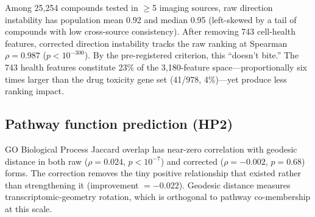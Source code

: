 \documentclass{article}
\begin{document}
Among 25{,}254 compounds tested in $\geq$5 imaging sources, raw direction
instability has population mean 0.92 and median 0.95 (left-skewed by a
tail of compounds with low cross-source consistency). After removing 743
cell-health features, corrected direction instability tracks the raw ranking
at Spearman $\rho = 0.987$ ($p < 10^{-300}$). By the pre-registered
criterion, this ``doesn't bite.'' The 743 health features constitute
23\% of the 3{,}180-feature space---proportionally six times larger than
the drug toxicity gene set (41/978, 4\%)---yet produce less ranking
impact.

\subsection{Pathway function prediction (HP2)}

GO Biological Process Jaccard overlap has near-zero correlation with geodesic
distance in both raw ($\rho = 0.024$, $p < 10^{-7}$) and corrected ($\rho =
-0.002$, $p = 0.68$) forms. The correction removes the tiny positive
relationship that existed rather than strengthening it (improvement $=
-0.022$). Geodesic distance measures transcriptomic-geometry rotation,
which is orthogonal to pathway co-membership at this scale.
\end{document}
